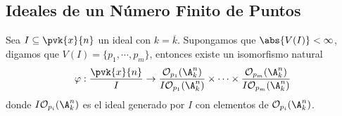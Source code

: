 \documentclass{article}
\begin{document}
\subsection{Ideales de un Número Finito de Puntos}
\begin{prop}
    Sea $I\subseteq\pvk{x}{n}$ un ideal con $k=\overline{k}$. Supongamos que $\abs{V(I)}<\infty$, 
    digamos que $V(I)=\{p_{1},\cdots,p_{m}\}$, entonces existe un isomorfismo natural
    \begin{equation*}
        \varphi:\frac{\pvk{x}{n}}{I}\to
        \frac{\mathcal{O}_{p_{1}}(\A_{k}^{n})}{I\mathcal{O}_{p_{1}}(\A_{k}^{n})}\times\cdots\times
        \frac{\mathcal{O}_{p_{m}}(\A_{k}^{n})}{I\mathcal{O}_{p_{m}}(\A_{k}^{n})}
    \end{equation*}
    donde $I\mathcal{O}_{p_{i}}(\A_{k}^{n})$ es el ideal generado por $I$ con elementos de 
    $\mathcal{O}_{p_{i}}(\A_{k}^{n})$.
\end{prop}
\end{document}
